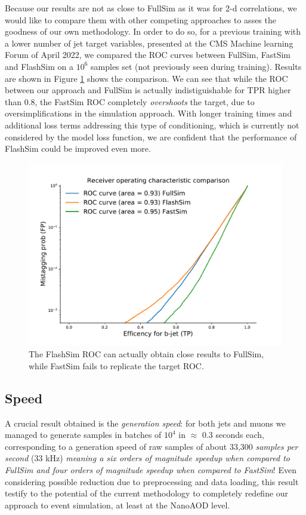 Because our results are not as close to FullSim as it was for 2-d correlations, we would like to compare them with other competing approaches to asses the goodness of our own methodology. In order to do so, for a previous training with a lower number of jet target variables, presented at the CMS Machine learning Forum of April 2022, we compared the ROC curves between FullSim, FastSim and FlashSim on a $10^{6}$ samples set (not previously seen during training). Results are shown in Figure \ref{fig:allrocs} shows the comparison. We can see that while the ROC between our approach and FullSim is actually indistiguishable for TPR higher than 0.8, the FastSim ROC completely \emph{overshoots} the target, due to oversimplifications in the simulation approach. With longer training times and additional loss terms addressing this type of conditioning, which is currently not considered by the model loss function, we are confident that the performance of FlashSim could be improved even more.

\begin{figure}
    \centering
    \includegraphics[width=\linewidth]{gfx/ch5/allrocs.pdf}
    \caption[ROC Comparison]{The FlashSim ROC can actually obtain close results to FullSim, while FastSim fails to replicate the target ROC.}
    \label{fig:allrocs}
\end{figure}


\subsection{Speed}

A crucial result obtained is the \emph{generation speed}: for both jets and muons we managed to generate samples in batches of $10^{4}$ in $\approx$ 0.3 seconds each, corresponding to a generation speed of raw samples of about 33,300 \emph{samples per second} (33 kHz) \emph{meaning a six orders of magnitude speedup when compared to FullSim and four orders of magnitude speedup when compared to FastSim}! Even considering possible reduction due to preprocessing and data loading, this result testify to the potential of the current methodology to completely redefine our approach to event simulation, at least at the NanoAOD level.

